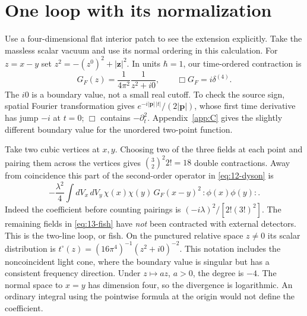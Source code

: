 \section{One loop with its normalization}
Use a four-dimensional flat interior patch to see the extension explicitly.
Take the massless scalar vacuum and use its normal ordering in this
calculation. For $z=x-y$ set $z^2=-(z^0)^2+|\mathbf z|^2$. In units
$\hbar=1$, our time-ordered contraction is
\[
 G_F(z)=\frac{1}{4\pi^2}\frac{1}{z^2+i0},\qquad
 \Box G_F=i\delta^{(4)} .
\]
The $i0$ is a boundary value, not a small real cutoff. To check the source
sign, spatial Fourier transformation gives
$e^{-i|\mathbf p|\,|t|}/(2|\mathbf p|)$, whose first time derivative has
jump $-i$ at $t=0$; $\Box$ contains $-\partial_t^2$.
Appendix~\ref{app:C} gives the slightly different boundary value for the
unordered two-point function.

Take two cubic vertices at $x,y$. Choosing two of the three fields at each
point and pairing them across the vertices gives
$\binom32^2 2!=18$ double contractions. Away from coincidence this part of
the second-order operator in \eqref{eq:12-dyson} is
\begin{equation}
 -\frac{\lambda^2}{4}
 \int dV_x\,dV_y\,\chi(x)\chi(y)\,
  G_F(x-y)^2\,:\!\phi(x)\phi(y)\!: .
 \label{eq:13-fish}
\end{equation}
Indeed the coefficient before counting pairings is
$(-i\lambda)^2/[2!(3!)^2]$. The remaining fields in
\eqref{eq:13-fish} have \emph{not} been contracted with external
detectors. This is the two-line loop, or fish. On the punctured relative
space $z\ne0$ its scalar distribution is
$t^\circ(z)=(16\pi^4)^{-1}(z^2+i0)^{-2}$. This notation includes the
noncoincident light cone, where the boundary value is singular but has a
consistent frequency direction. Under $z\mapsto a z$, $a>0$, the degree
is $-4$. The normal space to $x=y$ has dimension four, so the divergence
is logarithmic. An ordinary integral using the pointwise formula at the
origin would not define the coefficient.

